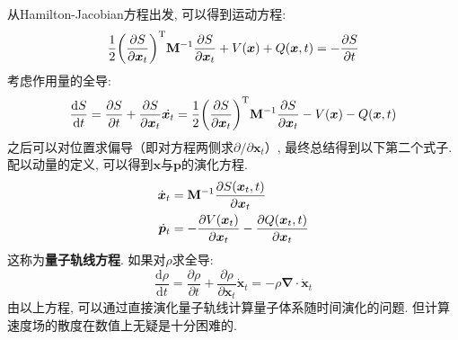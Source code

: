         从Hamilton-Jacobian方程出发, 可以得到运动方程: 
        \begin{equation}
            \frac 12 \bigg(\frac {\partial S}{\partial \bm{x}_t}\bigg)^{\mathrm{T}} \mathbf{M}^{-1} \frac {\partial S}{\partial \bm{x}_t} + V(\bm{x}) + Q(\bm{x}, t) = -\frac {\partial S}{\partial t}
        \end{equation}
        考虑作用量的全导: 
        \begin{equation}
            \frac {\mathrm{d}S}{\mathrm{d}t} = \frac {\partial S}{\partial t} + \frac {\partial S}{\partial \bm{x}_t} \dot{\bm{x}_t} = \frac 12 \bigg(\frac {\partial S}{\partial \bm{x}_t}\bigg)^{\mathrm{T}} \mathbf{M}^{-1} \frac {\partial S}{\partial \bm{x}_t} - V(\bm{x}) - Q(\bm{x}, t)
        \end{equation}
        之后可以对位置求偏导（即对方程两侧求${\partial} / {\partial \bm{x}_t}$）, 最终总结得到以下第二个式子. 配以动量的定义, 可以得到$\bm{x}$与$\bm{p}$的演化方程. 
        \begin{equation}\begin{aligned}
            \dot{\bm{x}}_t &= \mathbf{M}^{-1} \frac {\partial S(\bm{x}_t,t)}{\partial \bm{x}_t} \\
            \dot{\bm{p}}_t &= -\frac {\partial V(\bm{x}_t)}{\partial \bm{x}_t} - \frac {\partial Q(\bm{x}_t, t)}{\partial \bm{x}_t}
        \end{aligned}\end{equation}
        这称为\textbf{量子轨线方程}. 如果对$\rho$求全导: 
        \begin{equation}
            \frac {\mathrm{d}\rho}{\mathrm{d}t} = \frac {\partial \rho}{\partial t} + \frac {\partial \rho}{\partial \bm{x}_t} \dot{\bm{x}}_t = -\rho \bm{\nabla} \cdot \dot{\bm{x}}_t
        \end{equation}
        由以上方程, 可以通过直接演化量子轨线计算量子体系随时间演化的问题. 但计算速度场的散度在数值上无疑是十分困难的. 

        
        